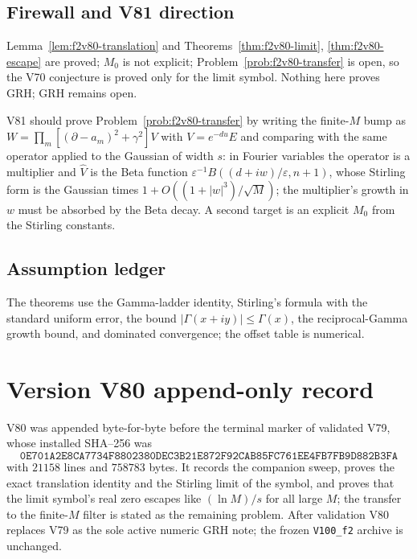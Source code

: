 \documentclass[11pt]{article}
\theoremstyle{definition}
\theoremstyle{remark}
\begin{document}
\subsection*{Firewall and V81 direction}
\label{fire:f2v80}
Lemma~\ref{lem:f2v80-translation} and Theorems~\ref{thm:f2v80-limit},
\ref{thm:f2v80-escape} are proved; \(M_0\) is not explicit;
Problem~\ref{prob:f2v80-transfer} is open, so the V70 conjecture is
proved only for the limit symbol.  Nothing here proves GRH; GRH remains
open.

V81 should prove Problem~\ref{prob:f2v80-transfer} by writing the
finite-\(M\) bump as \(W=\prod_m[(\partial-a_m)^2+\gamma^2]V\) with
\(V=e^{-du}E\) and comparing with the same operator applied to the
Gaussian of width \(s\): in Fourier variables the operator is a
multiplier and \(\widehat V\) is the Beta function
\(\varepsilon^{-1}B((d+iw)/\varepsilon,n+1)\), whose Stirling form is the
Gaussian times \(1+O((1+|w|^3)/\sqrt M)\); the multiplier's growth in
\(w\) must be absorbed by the Beta decay.  A second target is an explicit
\(M_0\) from the Stirling constants.

\subsection*{Assumption ledger}
\label{ass:f2v80}
The theorems use the Gamma-ladder identity, Stirling's formula with the
standard uniform error, the bound \(|\Gamma(x+iy)|\le\Gamma(x)\), the
reciprocal-Gamma growth bound, and dominated convergence; the offset
table is numerical.
\endgroup

\section*{Version V80 append-only record}

V80 was appended byte-for-byte before the terminal marker of validated
V79, whose installed SHA--256 was
\[
 \texttt{0E701A2E8CA7734F8802380DEC3B21E8}
 \allowbreak\texttt{72F92CAB85FC761EE4FB7FB9D882B3FA}
\]
with \(21158\) lines and \(758783\) bytes.  It records the companion
sweep, proves the exact translation identity and the Stirling limit of
the symbol, and proves that the limit symbol's real zero escapes like
\((\ln M)/s\) for all large \(M\); the transfer to the finite-\(M\)
filter is stated as the remaining problem.  After validation V80
replaces V79 as the sole active numeric GRH note; the frozen
\texttt{V100\_f2} archive is unchanged.
\end{document}
